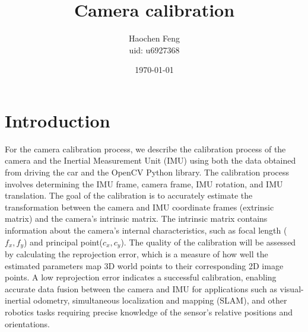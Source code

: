\documentclass{article}
\begin{document}
\title{Camera calibration}
\author{Haochen Feng \\uid: u6927368} 
\date{\today}
\maketitle

\section*{Introduction}
\noindent
For the camera calibration process, 
we describe the calibration process of the 
camera and the Inertial Measurement Unit (IMU) 
using both the data obtained from driving 
the car and the OpenCV Python library. 
The calibration process involves determining the IMU frame, 
camera frame, IMU rotation, and IMU translation. 
The goal of the calibration is to accurately 
estimate the transformation between the camera and 
IMU coordinate frames (extrinsic matrix) and the 
camera's intrinsic matrix. The intrinsic matrix 
contains information about the camera's internal 
characteristics, such as focal length ($f_x, f_y$) and principal point($c_x, c_y$). 
The quality of the calibration will 
be assessed by calculating the reprojection error, 
which is a measure of how well the estimated parameters 
map 3D world points to their corresponding 2D image points. 
A low reprojection error indicates 
a successful calibration, 
enabling accurate data fusion between the camera 
and IMU for applications such as visual-inertial odometry, 
simultaneous localization and mapping (SLAM), 
and other robotics tasks requiring precise 
knowledge of the sensor's relative positions and orientations.
\end{document}
